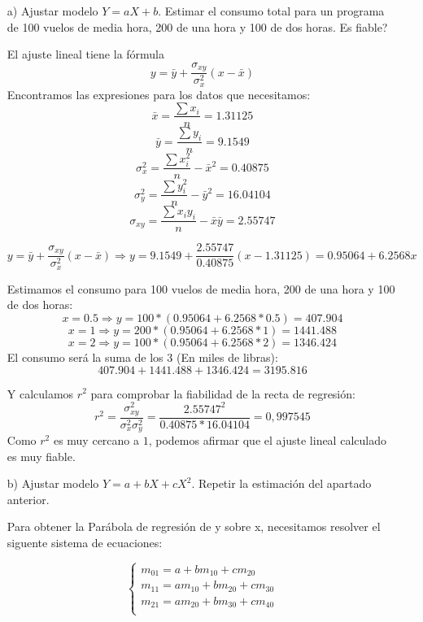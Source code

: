 \documentclass[a4paper,12pt]{article}
\begin{document}
\begin{enumerate}
    \item[a)] Ajustar modelo $Y = aX + b$. Estimar el consumo total para un programa de 100 vuelos de media hora, 200 de una hora y 100 de dos horas. \textquestiondown Es fiable?

    El ajuste lineal tiene la fórmula 
    $$y=\bar y + \frac {\sigma_{xy}}{\sigma_x^2}(x-\bar x)$$
    Encontramos las expresiones para los datos que necesitamos:
    $$\bar x=\frac {\sum x_i}{n} = 1.31125$$
    $$\bar y=\frac {\sum y_i}{n} = 9.1549$$
    $$\sigma_x^2=\frac {\sum x_i^2}{n}-\bar x^2 = 0.40875$$
    $$\sigma_y^2=\frac {\sum y_i^2}{n}-\bar y^2 = 16.04104$$
    $$\sigma_{xy}=\frac {\sum x_iy_i}{n}-\bar x\bar y = 2.55747$$

     $$y=\bar y + \frac {\sigma_{xy}}{\sigma_x^2}(x-\bar x) \Rightarrow y=9.1549 + \frac {2.55747}{0.40875}(x-1.31125) = 0.95064 + 6.2568x$$

    Estimamos el consumo para 100 vuelos de media hora, 200 de una hora y 100 de dos horas:
    $$x=0.5 \Rightarrow y= 100*(0.95064 + 6.2568*0.5)=407.904$$
    $$x=1 \Rightarrow y= 200*(0.95064 + 6.2568*1)=1441.488$$
    $$x=2 \Rightarrow y= 100*(0.95064 + 6.2568*2)=1346.424$$
    El consumo será la suma de los 3 (En miles de libras):
    $$407.904+1441.488+1346.424= 3195.816$$

    Y calculamos $r^2$ para comprobar la fiabilidad de la recta de regresión:
    $$r^2=\frac{\sigma_{xy}^2}{\sigma_x^2\sigma_y^2}= \frac{2.55747^2}{0.40875*16.04104}= 0,997545$$
    Como $r^2$ es muy cercano a $1$, podemos afirmar que el ajuste lineal calculado es muy fiable.


    \item[b)] Ajustar modelo $Y = a + bX + cX^2$. Repetir la estimación del apartado anterior.

    Para obtener la Parábola de regresión de y sobre x, necesitamos resolver el siguente sistema de ecuaciones:
    
    \begin{equation}
    \left\{
    \begin{array}{l}
    m_{01} = a + bm_{10} + cm_{20} \\
    m_{11} = am_{10} + bm_{20} +cm_{30}\\
    m_{21} =  am_{20} +bm_{30} + cm_{40}\\
    \end{array}
    \right.
    \end{equation}
    

\end{enumerate}
\end{document}
